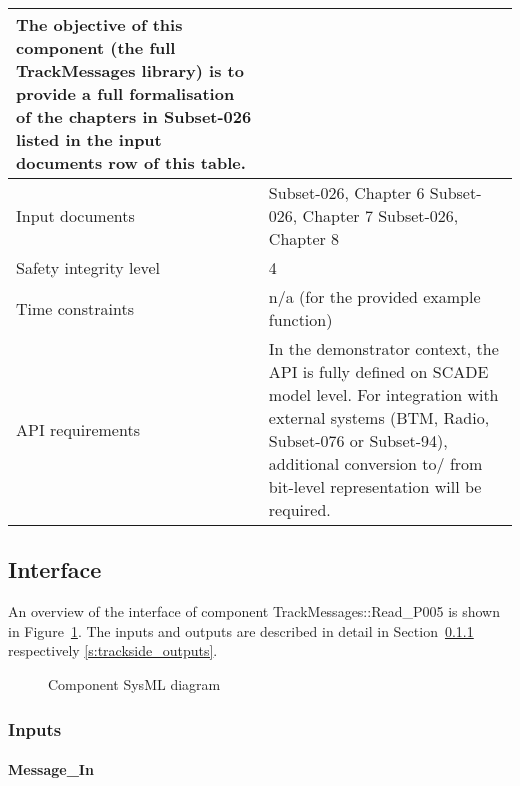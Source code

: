 \begin{longtable}{p{}p{}}
The objective of this component (the full TrackMessages library) is to provide a full formalisation of the chapters in Subset-026 listed in the input documents row of this table.
\\

\midrule
Input documents	& 
Subset-026, Chapter 6\newline
Subset-026, Chapter 7\newline
Subset-026, Chapter 8\newline
\\
\midrule
Safety integrity level	& 4 \\
\midrule
Time constraints		& n/a (for the provided example function) \\
\midrule
API requirements 		& In the demonstrator context, the API is fully defined on SCADE model level. For integration with external systems (BTM, Radio, Subset-076 or Subset-94), additional conversion to/ from bit-level representation will be required.\\
\bottomrule
\end{longtable}


\subsection{Interface}

An overview of the interface of component TrackMessages::Read\_P005 is shown in Figure~\ref{f:trackside_interface}. The inputs and outputs are described in detail in Section~\ref{s:trackside_inputs} respectively \ref{s:trackside_outputs}.

\begin{figure}
\center
{}
\caption{Component SysML diagram}\label{f:trackside_interface}
\end{figure}


\subsubsection{Inputs}\label{s:trackside_inputs}

\paragraph{Message\_In}

